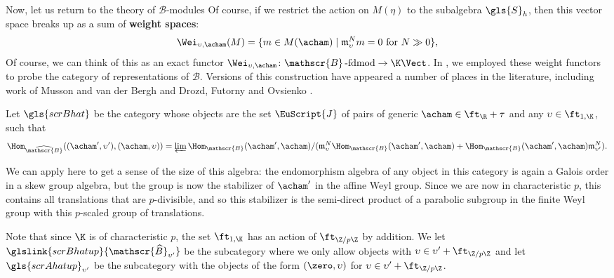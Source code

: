 Now, let us return to the theory of $\mathscr{B}$-modules Of course, if we restrict the action on $M(\eta)$ to the subalgebra
$\gls{S}_h$, then this vector space breaks up as a sum of {\bf weight spaces}:
\begin{equation}
  \label{eq:W-def}
  \Wei_{\upsilon,\acham}(M)=\{m\in M(\acham)\mid \mathfrak{m}_{\upsilon}^Nm=0 \text{ for } N\gg 0\},
\end{equation} 
Of course, we can think of this as an exact functor
$\Wei_{\upsilon,\acham}\colon \mathscr{B}\operatorname{-fdmod}\to \K\Vect$.
In \cite{WebSD}, we employed these weight functors to probe the
category of representations of  $\mathscr{B}$.   Versions of this
construction have appeared a number of places in the literature,
including work of Musson and van der Bergh \cite{MVdB} and Drozd,
Futorny and Ovsienko \cite{FOD}.
\begin{definition}
  Let $\gls{scrBhat}$ be the category whose objects are the
  set $\EuScript{J}$ of pairs of generic $\acham\in \ft_\R+\tau$ and any
  $\upsilon\in \ft_{1,\K}$, such that
  \[\Hom_{\widehat{\mathscr{B}}}((\acham',\upsilon'),(\acham,\upsilon))=\varprojlim
  \Hom_{{\mathscr{B}}}(\acham',\acham)/(\mathfrak{m}_{\upsilon}^N
  \Hom_{{\mathscr{B}}}(\acham',\acham)+\Hom_{{\mathscr{B}}}(\acham',\acham)\mathfrak{m}_{\upsilon'}^N).\] 
\end{definition}
We can apply \cite[Theorem B]{WebGT} here to get a sense of the size
of this algebra: the endomorphism algebra
of any object in this category is again a Galois order in a skew group
algebra, but the group is now the stabilizer of $\acham'$ in the
affine Weyl group. Since we are now in characteristic $p$, this
contains all translations that are $p$-divisible, and so this
stabilizer is the semi-direct product of a parabolic subgroup in the
finite Weyl group with this $p$-scaled group of translations.  


Note that since $\K$ is of characteristic $p$, the set $\ft_{1,\K}$
has an action of $\ft_{\Z/p\Z}$ by addition.
We let $\glslink{scrBhatup}{\mathscr{\widehat{B}}_{\upsilon'}}$ be the subcategory where we only
allow objects  with $\upsilon\in \upsilon'+\ft_{\Z/p\Z}$ and let
$\gls{scrAhatup}_{\upsilon'}$ be the subcategory with the objects of the form
$(\zero,\upsilon)$ for $\upsilon \in \upsilon'+\ft_{\Z/p\Z}$.  

